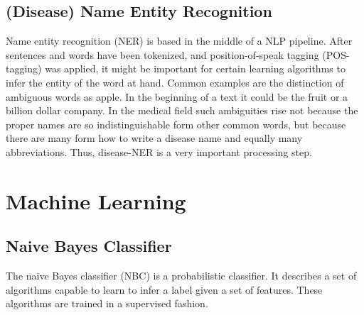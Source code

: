 \subsection{(Disease) Name Entity Recognition}
Name entity recognition (NER) is based in the middle of a NLP pipeline. After
sentences and words have been tokenized, and position-of-speak tagging (POS-
tagging) was applied, it might be important for certain learning algorithms to
infer the entity of the word at hand. Common examples are the distinction of
ambiguous words as apple. In the beginning of a text it could be the fruit or a
billion dollar company.
In the medical field such ambiguities rise not because the proper names are so
indistinguishable form other common words, but because there are many form
how to write a disease name and equally many abbreviations. Thus, disease-NER
is a very important processing step.

\section{Machine Learning}

\subsection{Naive Bayes Classifier}
The naive Bayes classifier (NBC) is a probabilistic classifier. It describes a set
of algorithms capable to learn to infer a label given a set of features. These
algorithms are trained in a supervised fashion.

